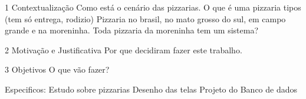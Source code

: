 1 Contextualização
	Como está o cenário das pizzarias.
	O que é uma pizzaria
	tipos (tem só entrega, rodizio)
	Pizzaria no brasil, no mato grosso do sul, em campo grande e na moreninha.
	Toda pizzaria da moreninha tem um sistema?

2 Motivação e Justificativa
	Por que decidiram fazer este trabalho.

3 Objetivos
	O que vão fazer?

	Especificos:
	Estudo sobre pizzarias
	Desenho das telas
	Projeto do Banco de dados